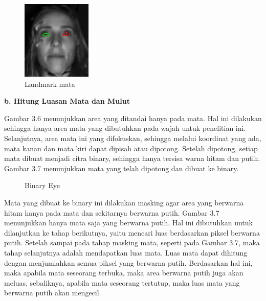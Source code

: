 \begin{enumerate}
\begin{figure} [H] \centering
  \includegraphics[scale=1.65]{gambar/mata.jpg}
  \caption{Landmark mata}
  \label{fig:Landmarkmata}
\end{figure}

  \textbf{b. Hitung Luasan Mata dan Mulut}

  Gambar 3.6 menunjukkan area yang ditandai hanya pada mata. Hal ini dilakukan sehingga hanya area mata yang dibutuhkan pada wajah untuk penelitian ini. Selanjutnya, area mata ini yang difokuskan, sehingga melalui koordinat yang ada, mata kanan dan mata kiri dapat dipisah atau dipotong. Setelah dipotong, setiap mata dibuat menjadi citra binary, sehingga hanya tersisa warna hitam dan putih. Gambar 3.7 menunjukkan mata yang telah dipotong dan dibuat ke binary.

  \begin{figure}[htbp]
    \centering
    \hspace{0.5cm}
    \caption{Binary Eye}
    \label{fig:Binary_eye}
  \end{figure}
  

Mata yang dibuat ke binary ini dilakukan masking agar area yang berwarna hitam hanya pada mata dan sekitarnya berwarna putih. Gambar 3.7 menunjukkan hanya mata saja yang berwarna putih. Hal ini dibutuhkan untuk dilanjutkan ke tahap berikutnya, yaitu mencari luas berdasarkan piksel berwarna putih. Setelah sampai pada tahap masking mata, seperti pada Gambar 3.7, maka tahap selanjutnya adalah mendapatkan luas mata. Luas mata dapat dihitung dengan menjumlahkan semua piksel yang berwarna putih. Berdasarkan hal ini, maka apabila mata seseorang terbuka, maka area berwarna putih juga akan meluas, sebaliknya, apabila mata seseorang tertutup, maka luas mata yang berwarna putih akan mengecil.


\end{enumerate}
